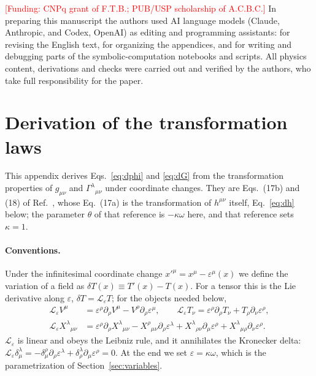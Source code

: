 \documentclass[prd,aps,preprint,superscriptaddress,nofootinbib,amsmath,amssymb,eqsecnum]{revtex4-2}
\newcommand{\todo}[1]{\textcolor{red}{[#1]}}
\begin{document}
\begin{acknowledgments}
\todo{Funding: CNPq grant of F.T.B.; PUB/USP scholarship of A.C.B.C.}
In preparing this manuscript the authors used AI language models (Claude, Anthropic, and
Codex, OpenAI) as editing and programming assistants: for revising the English text, for
organizing the appendices, and for writing and debugging parts of the symbolic-computation
notebooks and scripts. All physics content, derivations and checks were carried out and
verified by the authors, who take full responsibility for the paper.
\end{acknowledgments}

\appendix

\section{Derivation of the transformation laws}
\label{app:transf}

This appendix derives Eqs.~\eqref{eq:dphi} and \eqref{eq:dG} from the transformation
properties of $g_{\mu\nu}$ and $\Gamma^{\lambda}{}_{\mu\nu}$ under coordinate changes. They are Eqs.~(17b) and (18) of
Ref.~\cite{BrandtMcKeon2015}, whose Eq.~(17a) is the transformation of $h^{\mu\nu}$ itself,
Eq.~\eqref{eq:dh} below; the parameter $\theta$ of that reference is $-\kappa\omega$ here, and
that reference sets $\kappa=1$.

\paragraph{Conventions.} Under the infinitesimal coordinate change
$x'^\mu=x^\mu-\varepsilon^\mu(x)$ we define the variation of a field as
$\delta T(x)\equiv T'(x)-T(x)$. For a tensor this is the Lie derivative along $\varepsilon$,
$\delta T=\mathcal{L}_\varepsilon T$; for the objects needed below,
\begin{align}
\mathcal{L}_\varepsilon V^\mu&=\varepsilon^\rho\partial_\rho V^\mu-V^\rho\partial_\rho\varepsilon^\mu,\qquad
\mathcal{L}_\varepsilon T_\nu=\varepsilon^\rho\partial_\rho T_\nu+T_\rho\partial_\nu\varepsilon^\rho,\\
\mathcal{L}_\varepsilon X^{\lambda}{}_{\mu\nu}&=\varepsilon^\rho\partial_\rho X^{\lambda}{}_{\mu\nu}
-X^{\rho}{}_{\mu\nu}\partial_\rho\varepsilon^\lambda
+X^{\lambda}{}_{\rho\nu}\partial_\mu\varepsilon^\rho
+X^{\lambda}{}_{\mu\rho}\partial_\nu\varepsilon^\rho.
\label{eq:lie12}
\end{align}
$\mathcal{L}_\varepsilon$ is linear and obeys the Leibniz rule, and it annihilates the
Kronecker delta: $\mathcal{L}_\varepsilon\delta^\lambda_\mu
=-\delta^{\rho}_{\mu}\partial_\rho\varepsilon^\lambda+\delta^{\lambda}_{\rho}\partial_\mu\varepsilon^\rho=0$.
At the end we set $\varepsilon=\kappa\omega$, which is the parametrization of
Section~\ref{sec:variables}.
\end{document}
